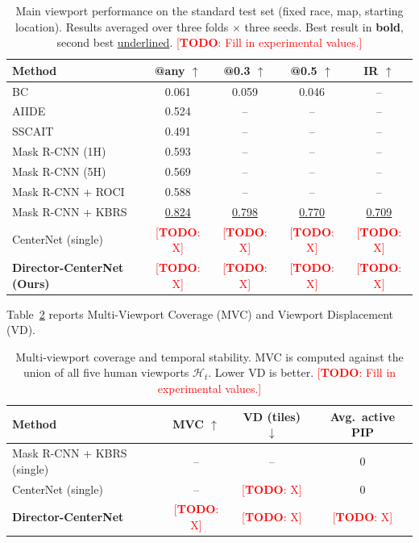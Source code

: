 \documentclass[preprint,12pt]{elsarticle}
\newcommand{\todo}[1]{\textcolor{red}{[\textbf{TODO}: #1]}}
\begin{document}
\begin{table}[t]
  \centering
  \caption{Main viewport performance on the standard test set (fixed race, 
  map, starting location). Results averaged over three folds $\times$ three 
  seeds. Best result in \textbf{bold}, second best \underline{underlined}. 
  \todo{Fill in experimental values.}}
  \label{tab:main_results}
  \begin{tabular}{lcccc}
    \toprule
    Method & @any $\uparrow$ & @0.3 $\uparrow$ & @0.5 $\uparrow$ 
           & IR $\uparrow$ \\
    \midrule
    BC                         & 0.061 & 0.059 & 0.046 & -- \\
    AIIDE                      & 0.524 & --    & --    & -- \\
    SSCAIT                     & 0.491 & --    & --    & -- \\
    Mask R-CNN (1H)            & 0.593 & --    & --    & -- \\
    Mask R-CNN (5H)            & 0.569 & --    & --    & -- \\
    Mask R-CNN + ROCI          & 0.588 & --    & --    & -- \\
    Mask R-CNN + KBRS          & \underline{0.824} & \underline{0.798} 
                               & \underline{0.770} & \underline{0.709} \\
    CenterNet (single)         & \todo{X} & \todo{X} & \todo{X} & \todo{X} \\
    \midrule
    \textbf{Director-CenterNet (Ours)} & \todo{X} & \todo{X} 
                               & \todo{X} & \todo{X} \\
    \bottomrule
  \end{tabular}
\end{table}

Table~\ref{tab:mvc_results} reports Multi-Viewport Coverage (MVC) and 
Viewport Displacement (VD).

\begin{table}[t]
  \centering
  \caption{Multi-viewport coverage and temporal stability. MVC is computed 
  against the union of all five human viewports $\mathcal{H}_t$. Lower VD 
  is better. \todo{Fill in experimental values.}}
  \label{tab:mvc_results}
  \begin{tabular}{lccc}
    \toprule
    Method & MVC $\uparrow$ & VD (tiles) $\downarrow$ & Avg.\ active PIP \\
    \midrule
    Mask R-CNN + KBRS (single)       & -- & -- & 0 \\
    CenterNet (single)               & -- & \todo{X} & 0 \\
    \textbf{Director-CenterNet}      & \todo{X} & \todo{X} & \todo{X} \\
    \bottomrule
  \end{tabular}
\end{table}
\end{document}
